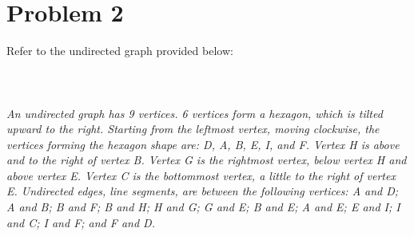 \documentclass{amsart}
\theoremstyle{definition}
\theoremstyle{Exercise}
\theoremstyle{remark}
\theoremstyle{rule}
\numberwithin{equation}{section}
\begin{document}
 \newpage

 
\vspace*{0.1in}
\section*{Problem 2}    
    
Refer to the undirected graph provided below:
\\\\
  \\\\
{\color{blue}{\bf Figure 6:} \emph{An undirected graph has 9 vertices. 6 vertices form a hexagon, which is tilted upward to the right. Starting from the leftmost vertex, moving clockwise, the vertices forming the hexagon shape are: D, A, B, E, I, and F. Vertex H is above and to the right of vertex B. Vertex G is the rightmost vertex, below vertex H and above vertex E. Vertex C is the bottommost vertex, a little to the right of vertex E. Undirected edges, line segments, are between the following vertices: A and D; A and B; B and F; B and H; H and G; G and E; B and E; A and E; E and I; I and C; I and F; and F and D.
}
}
\\
\\
\end{document}
